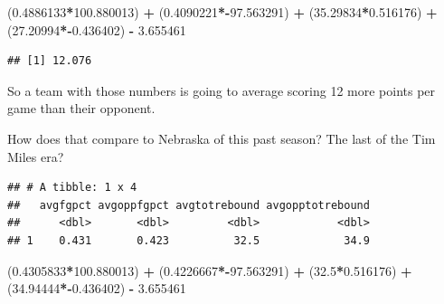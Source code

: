 \documentclass[]{book}
\newenvironment{Shaded}{\begin{snugshade}}{\end{snugshade}}
\newcommand{\DataTypeTok}[1]{\textcolor[rgb]{0.13,0.29,0.53}{#1}}
\newcommand{\FloatTok}[1]{\textcolor[rgb]{0.00,0.00,0.81}{#1}}
\newcommand{\KeywordTok}[1]{\textcolor[rgb]{0.13,0.29,0.53}{\textbf{#1}}}
\newcommand{\NormalTok}[1]{#1}
\newcommand{\OperatorTok}[1]{\textcolor[rgb]{0.81,0.36,0.00}{\textbf{#1}}}
\newcommand{\StringTok}[1]{\textcolor[rgb]{0.31,0.60,0.02}{#1}}
\begin{document}
\begin{Shaded}
\begin{Highlighting}[]
\NormalTok{(}\FloatTok{0.4886133}\OperatorTok{*}\FloatTok{100.880013}\NormalTok{) }\OperatorTok{+}\StringTok{ }\NormalTok{(}\FloatTok{0.4090221}\OperatorTok{*-}\FloatTok{97.563291}\NormalTok{) }\OperatorTok{+}\StringTok{ }\NormalTok{(}\FloatTok{35.29834}\OperatorTok{*}\FloatTok{0.516176}\NormalTok{) }\OperatorTok{+}\StringTok{ }\NormalTok{(}\FloatTok{27.20994}\OperatorTok{*-}\FloatTok{0.436402}\NormalTok{) }\OperatorTok{-}\StringTok{ }\FloatTok{3.655461}
\end{Highlighting}
\end{Shaded}

\begin{verbatim}
## [1] 12.076
\end{verbatim}

So a team with those numbers is going to average scoring 12 more points per game than their opponent.

How does that compare to Nebraska of this past season? The last of the Tim Miles era?

\begin{Shaded}
\end{Shaded}

\begin{verbatim}
## # A tibble: 1 x 4
##   avgfgpct avgoppfgpct avgtotrebound avgopptotrebound
##      <dbl>       <dbl>         <dbl>            <dbl>
## 1    0.431       0.423          32.5             34.9
\end{verbatim}

\begin{Shaded}
\begin{Highlighting}[]
\NormalTok{(}\FloatTok{0.4305833}\OperatorTok{*}\FloatTok{100.880013}\NormalTok{) }\OperatorTok{+}\StringTok{ }\NormalTok{(}\FloatTok{0.4226667}\OperatorTok{*-}\FloatTok{97.563291}\NormalTok{) }\OperatorTok{+}\StringTok{ }\NormalTok{(}\FloatTok{32.5}\OperatorTok{*}\FloatTok{0.516176}\NormalTok{) }\OperatorTok{+}\StringTok{ }\NormalTok{(}\FloatTok{34.94444}\OperatorTok{*-}\FloatTok{0.436402}\NormalTok{) }\OperatorTok{-}\StringTok{ }\FloatTok{3.655461}
\end{Highlighting}
\end{Shaded}
\end{document}
